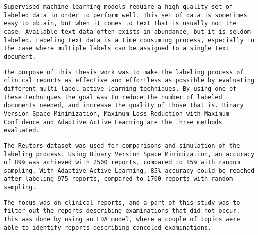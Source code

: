 \texttt{Supervised machine learning models require a high quality set of labeled data in order to perform well.
This set of data is sometimes easy to obtain, but when it comes to text that is usually not the case.
Available text data often exists in abundance, but it is seldom labeled.
Labeling text data is a time consuming process, especially in the case where multiple labels can be assigned to a single text document.}

\texttt{The purpose of this thesis work was to make the labeling process of clinical reports as effective and effortless as possible by evaluating different multi-label active learning techniques.
By using one of these techniques the goal was to reduce the number of labeled documents needed, and increase the quality of those that is.
Binary Version Space Minimization, Maximum Loss Reduction with Maximum Confidence and Adaptive Active Learning are the three methods evaluated.}

\texttt{The Reuters dataset was used for comparisons and simulation of the labeling process.
Using Binary Version Space Minimization, an accuracy of 89\% was achieved with 2500 reports, compared to 85\% with random sampling.
With Adaptive Active Learning, 85\% accuracy could be reached after labeling 975 reports, compared to 1700 reports with random sampling.}

\texttt{The focus was on clinical reports, and a part of this study was to filter out the reports describing examinations that did not occur.
This was done by using an LDA model, where a couple of topics were able to identify reports describing canceled examinations.}